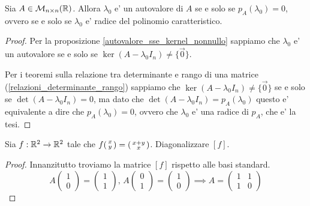 \begin{theorem}
    Sia $A \in \mathcal{M}_{n \times n}(\mathbb{R})$. Allora $\lambda_0$ e' un autovalore di $A$ se e solo se $p_A(\lambda_0) = 0$, ovvero se e solo se $\lambda_0$ e' radice del polinomio caratteristico.
\end{theorem}
\begin{proof}
    Per la proposizione \ref{autovalore_sse_kernel_nonnullo} sappiamo che $\lambda_0$ e' un autovalore se e solo se $\ker (A - \lambda_0 I_n) \neq \{\vec 0\}$.  
    
    Per i teoremi sulla relazione tra determinante e rango di una matrice (\ref{relazioni_determinante_rango}) sappiamo che $\ker (A - \lambda_0 I_n) \neq \{\vec 0\}$ se e solo se $\det (A - \lambda_0 I_n) = 0$, ma dato che $\det (A - \lambda_0 I_n) = p_A(\lambda_0)$ questo e' equivalente a dire che $p_A(\lambda_0) = 0$, ovvero che $\lambda_0$ e' una radice di $p_A$, che e' la tesi.
\end{proof}

\begin{example}
    Sia $f : \mathbb{R}^2 \to \mathbb{R}^2$ tale che $f\begin{psmallmatrix} x \\ y \end{psmallmatrix} = \begin{psmallmatrix} x + y \\ x \end{psmallmatrix}$. Diagonalizzare $[f]$.
\end{example}
\begin{proof}
    Innanzitutto troviamo la matrice $[f]$ rispetto alle basi standard.
    \begin{equation*}
        A\begin{pmatrix} 1 \\ 0 \end{pmatrix} = \begin{pmatrix} 1 \\ 1 \end{pmatrix},
            \,A\begin{pmatrix} 0 \\ 1 \end{pmatrix} = \begin{pmatrix} 1 \\ 0 \end{pmatrix}
        \implies A = \begin{pmatrix}
            1 & 1 \\ 1 & 0
        \end{pmatrix}
    \end{equation*}
\end{proof}